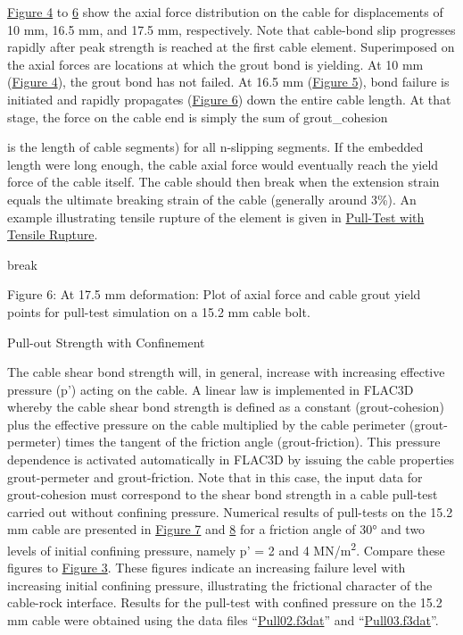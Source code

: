 \documentclass[a4paper, nobind]{templates/ociamthesis}
\begin{document}
\protect\hyperlink{pulltest-force1}{Figure 4} to \protect\hyperlink{pulltest-force3}{6}
show the axial force distribution on the cable for displacements of 10
mm, 16.5
mm, and 17.5 mm, respectively. Note that cable-bond slip progresses
rapidly
after peak strength is reached at the first cable element. Superimposed
on the
axial forces are locations at which the grout bond is yielding. At 10 mm
(\protect\hyperlink{pulltest-force1}{Figure 4}), the grout bond has not failed. At 16.5
mm
(\protect\hyperlink{pulltest-force2}{Figure 5}), bond failure is initiated and rapidly
propagates (\protect\hyperlink{pulltest-force3}{Figure 6}) down the entire cable
length. At that stage, the force on the cable end is simply the sum of
grout\_cohesion

is the length of cable segments) for all n-slipping
segments. If the embedded length were long enough, the cable axial force
would
eventually reach the yield force of the cable itself. The cable should
then
break when the extension strain equals the ultimate breaking strain of
the cable
(generally around 3\%). An example illustrating tensile rupture of the
element is
given in \protect\hyperlink{pulltest-tensile-rupture-section}{Pull-Test with Tensile
Rupture}.

break

Figure 6: At 17.5 mm deformation: Plot of axial force and cable
grout yield points for pull-test simulation on a 15.2 mm cable bolt.

Pull-out Strength with
Confinement

The cable shear bond strength will, in general, increase with increasing
effective pressure (p') acting on the cable. A linear law
is implemented in FLAC3D whereby the cable shear
bond strength is defined as a constant (grout-cohesion) plus the
effective pressure on the cable
multiplied by the cable perimeter (grout-permeter)
times the tangent of the friction angle (grout-friction). This pressure
dependence is activated
automatically in FLAC3D by issuing the cable
properties grout-permeter and grout-friction. Note that in this case,
the input data for
grout-cohesion must correspond to the shear bond
strength in a cable pull-test carried out without confining pressure.
Numerical
results of pull-tests on the 15.2 mm cable are presented in \protect\hyperlink{pulltest-cable2}{Figure
7} and \protect\hyperlink{pulltest-cable3}{8} for a
friction angle of 30° and two levels of initial confining pressure,
namely p' = 2 and 4 MN/m\textsuperscript{2}. Compare these figures to \protect\hyperlink{pulltest-cable1}{Figure
3}. These figures indicate an increasing
failure level with increasing initial confining pressure, illustrating
the
frictional character of the cable-rock interface. Results for the
pull-test with
confined pressure on the 15.2 mm cable were obtained using the data
files ``\protect\hyperlink{pulltest02data}{Pull02.f3dat}''
and ``\protect\hyperlink{pulltest03data}{Pull03.f3dat}''.
\end{document}
